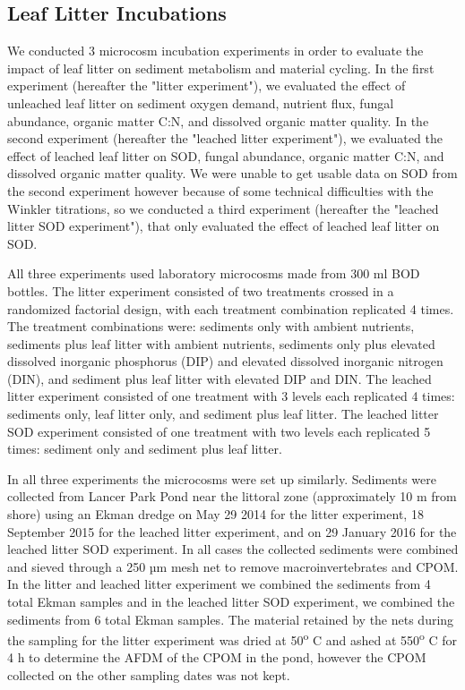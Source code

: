 \subsection{Leaf Litter Incubations}
We conducted 3 microcosm incubation experiments in order to evaluate the impact of leaf litter on sediment metabolism and material cycling. In the first experiment (hereafter the "litter experiment"), we evaluated the effect of unleached leaf litter on sediment oxygen demand, nutrient flux, fungal abundance, organic matter C:N, and dissolved organic matter quality. In the second experiment (hereafter the "leached litter experiment"), we evaluated the effect of leached leaf litter on SOD, fungal abundance, organic matter C:N, and dissolved organic matter quality. We were unable to get usable data on SOD from the second experiment however because of some technical difficulties with the Winkler titrations, so we conducted a third experiment (hereafter the "leached litter SOD experiment"), that only evaluated the effect of leached leaf litter on SOD.

All three experiments used laboratory microcosms made from 300 ml BOD bottles. The litter experiment consisted of two treatments crossed in a randomized factorial design, with each treatment combination replicated 4 times. The treatment combinations were: sediments only with ambient nutrients, sediments plus leaf litter with ambient nutrients, sediments only plus elevated dissolved inorganic phosphorus (DIP) and elevated dissolved inorganic nitrogen (DIN), and sediment plus leaf litter with elevated DIP and DIN. The leached litter experiment consisted of one treatment with 3 levels each replicated 4 times: sediments only, leaf litter only, and sediment plus leaf litter.  The leached litter SOD experiment consisted of one treatment with two levels each replicated 5 times: sediment only and sediment plus leaf litter. 

In all three experiments the microcosms were set up similarly. Sediments were collected from Lancer Park Pond near the littoral zone (approximately 10 m from shore) using an Ekman dredge on May 29 2014 for the litter experiment, 18 September 2015 for the leached litter experiment, and on 29 January 2016 for the leached litter SOD experiment.  In all cases the collected sediments were combined and sieved through a 250 µm mesh net to remove macroinvertebrates and CPOM. In the litter and leached litter experiment we combined the sediments from 4 total Ekman samples and in the leached litter SOD experiment, we combined the sediments from 6 total Ekman samples. The material retained by the nets during the sampling for the litter experiment was dried at 50\textsuperscript{o} C and ashed at 550\textsuperscript{o} C for 4 h to determine the AFDM of the CPOM in the pond, however the CPOM collected on the other sampling dates was not kept. 

